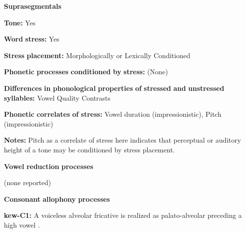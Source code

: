 \documentclass[output=paper]{langsci/langscibook}
\begin{document}
\begin{styleBody}
\textbf{Suprasegmentals}
\end{styleBody}

\begin{styleBody}
\textbf{Tone:} Yes
\end{styleBody}

\begin{styleBody}
\textbf{Word} \textbf{stress:} Yes
\end{styleBody}

\begin{styleBody}
\textbf{Stress} \textbf{placement:} Morphologically or Lexically Conditioned
\end{styleBody}

\begin{styleBody}
\textbf{Phonetic} \textbf{processes} \textbf{conditioned} \textbf{by} \textbf{stress:} (None)
\end{styleBody}

\begin{styleBody}
\textbf{Differences} \textbf{in} \textbf{phonological} \textbf{properties} \textbf{of} \textbf{stressed} \textbf{and} \textbf{unstressed} \textbf{syllables:} Vowel Quality Contrasts
\end{styleBody}

\begin{styleBody}
\textbf{Phonetic} \textbf{correlates} \textbf{of} \textbf{stress:} Vowel duration (impressionistic), Pitch (impressionistic)
\end{styleBody}

\begin{styleBody}
\textbf{Notes:} Pitch as a correlate of stress here indicates that perceptual or auditory height of a tone may be conditioned by stress placement.
\end{styleBody}

\begin{styleBody}
\textbf{Vowel} \textbf{reduction} \textbf{processes}
\end{styleBody}

\begin{styleBody}
(none reported)
\end{styleBody}

\begin{styleBody}
\textbf{Consonant} \textbf{allophony} \textbf{processes}
\end{styleBody}

\begin{styleBody}
\textbf{kew-C1:} A voiceless alveolar fricative is realized as palato-alveolar preceding a high vowel \citep[24]{Franklin1971}.
\end{styleBody}
\end{document}
